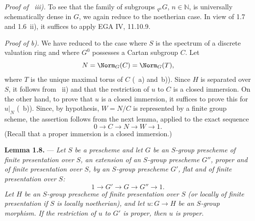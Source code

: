 \smallskip
\noindent\textit{Proof of ~iii).}
To see that the family of subgroups
\({}_{q^n}G\), \(n\in\mathbb N\), is universally schematically dense
in \(G\), we again reduce to the noetherian case. In view of 1.7 and
1.6~ii), it suffices to apply EGA IV, 11.10.9.

\medskip
\noindent\textit{Proof of  b).}
We have reduced to the case where \(S\) is the spectrum of a discrete
valuation ring and where \(G^0\) possesses a Cartan subgroup \(C\).
Let
\[
  N=\Norm_G(C)=\Norm_G(T),
\]
where \(T\) is the unique maximal torus of \(C\) (~a) and~b)). Since \(H\) is separated over \(S\), it follows from
~ii) and  that the restriction of \(u\) to \(C\)
is a closed immersion. On the other hand, to prove that \(u\) is a
closed immersion, it suffices to prove this for \(u|_N\) (~b)).
Since, by hypothesis, \(W=N/C\) is represented by a finite group
scheme, the assertion follows from the next lemma, applied to the
exact sequence
\[
  0\longrightarrow C\longrightarrow N\longrightarrow W
  \longrightarrow 1.
\]
(Recall that a proper immersion is a closed immersion.)

\medskip
\noindent{}%
\textbf{Lemma 1.8.} --- \textit{Let \(S\) be a prescheme and let
\(G\) be an \(S\)-group prescheme of finite presentation over \(S\),
an extension of an \(S\)-group prescheme \(G''\), proper and of finite
presentation over \(S\), by an \(S\)-group prescheme \(G'\), flat and
of finite presentation over \(S\):}
\[
  1\longrightarrow G'\longrightarrow G\longrightarrow G''
  \longrightarrow 1.
\]
\textit{Let \(H\) be an \(S\)-group prescheme of finite presentation
over \(S\) (or locally of finite presentation if \(S\) is locally
noetherian), and let \(u:G\to H\) be an \(S\)-group morphism. If the
restriction of \(u\) to \(G'\) is proper, then \(u\) is proper.}

